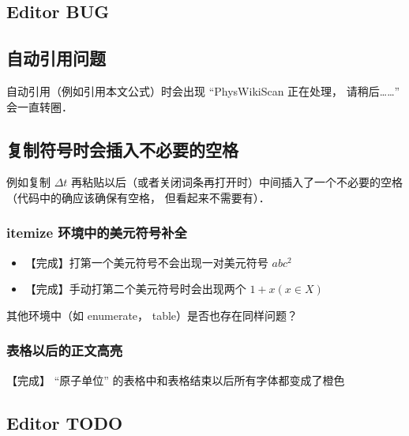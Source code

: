 
\subsection{Editor BUG}

\subsection{自动引用问题}
自动引用（例如引用本文公式）时会出现 “PhysWikiScan 正在处理， 请稍后\dots\dots” 会一直转圈．

\subsection{复制符号时会插入不必要的空格}
例如复制 $\Delta t$ 再粘贴以后（或者关闭词条再打开时）中间插入了一个不必要的空格（代码中的确应该确保有空格， 但看起来不需要有）．

\subsubsection{itemize 环境中的美元符号补全}
\begin{itemize}
\item 【完成】打第一个美元符号不会出现一对美元符号 $abc^2$
\item 【完成】手动打第二个美元符号时会出现两个 $1 + x (x \in X)$
\end{itemize}
其他环境中（如 enumerate， table）是否也存在同样问题？

\subsubsection{表格以后的正文高亮}
【完成】 “原子单位” 的表格中和表格结束以后所有字体都变成了橙色

\subsection{Editor TODO}

